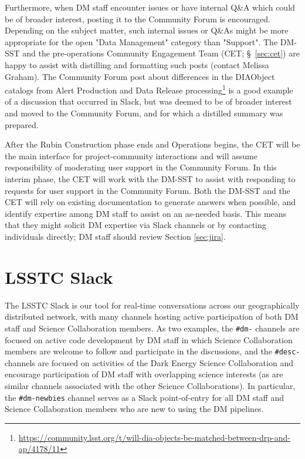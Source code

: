 \documentclass[DM,lsstdraft,authoryear,toc]{lsstdoc}
\begin{document}
Furthermore, when DM staff encounter issues or have internal Q\&A which could be of broader interest, posting it to the Community Forum is encouraged.
Depending on the subject matter, such internal issues or Q\&As might be more appropriate for the open "Data Management" category than "Support". 
The DM-SST and the pre-operations Community Engagement Team (CET; \S~\ref{sec:cet}) are happy to assist with distilling and formatting such posts (contact Melissa Graham).
The Community Forum post about differences in the \gls{DIAObject} catalogs from \gls{Alert Production} and \gls{Data Release} processing\footnote{\url{https://community.lsst.org/t/will-dia-objects-be-matched-between-drp-and-ap/4178/11}} is a good example of a discussion that occurred in Slack, but was deemed to be of broader interest and moved to the Community Forum, and for which a distilled summary was prepared.

After the Rubin Construction phase ends and Operations begins, the CET will be the main interface for project-community interactions and will assume responsibility of moderating user support in the Community Forum.
In this interim phase, the CET will work with the DM-SST to assist with responding to requests for user support in the Community Forum.
Both the DM-SST and the CET will rely on existing documentation to generate answers when possible, and identify expertise among DM staff to assist on an as-needed basis.
This means that they might solicit DM expertise via Slack channels or by contacting individuals directly; DM staff should review Section \ref{sec:jira}.

\section{LSSTC Slack}\label{sec:slack}

The LSSTC Slack is our tool for real-time conversations across our geographically distributed network, with many channels hosting active participation of both DM staff and Science Collaboration members.
As two examples, the {\tt \#dm-} channels are focused on active code development by DM staff in which Science Collaboration members are welcome to follow and participate in the discussions, and the {\tt \#desc-} channels are focused on activities of the Dark Energy Science Collaboration and encourage participation of DM staff with overlapping science interests (as are similar channels associated with the other Science Collaborations).
In particular, the {\tt \#dm-newbies} channel serves as a Slack point-of-entry for all DM staff and Science Collaboration members who are new to using the DM pipelines.
\end{document}
